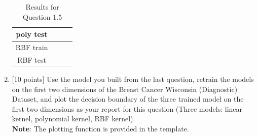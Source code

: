 \documentclass[letterpaper]{article}
\begin{document}
\begin{enumerate}
\begin{table}[H]
\begin{tabular}{|c|c|c|c|}
    \hline
     poly   test    &  &  & \\
    \hline
     RBF    train   &  &  & \\
    \hline
     RBF    test    &  &  & \\
    \hline
    \end{tabular}
    \caption{Results for Question 1.5}
    \end{table}
    \item {[10 points]} Use the model you built from the last question, retrain the models on the first two dimensions of the Breast Cancer Wisconsin (Diagnostic) Dataset, and plot the decision boundary of the three trained model on the first two dimensions as your report for this question (Three models: linear kernel, polynomial kernel, RBF kernel).\\
    \textbf{Note}: The plotting function is provided in the template. \\
  
 \end{enumerate}
\end{document}
